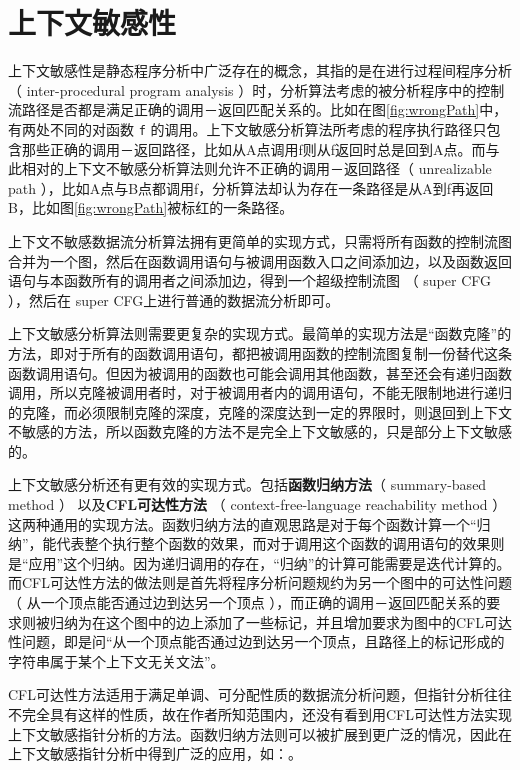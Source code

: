 \section{上下文敏感性}
上下文敏感性是静态程序分析中广泛存在的概念，其指的是在进行过程间程序分析（ inter-procedural program analysis ）时，分析算法考虑的被分析程序中的控制流路径是否都是满足正确的调用－返回匹配关系的。比如在图\ref{fig:wrongPath}中，有两处不同的对函数 \verb|f| 的调用。上下文敏感分析算法所考虑的程序执行路径只包含那些正确的调用－返回路径，比如从A点调用f则从f返回时总是回到A点。而与此相对的上下文不敏感分析算法则允许不正确的调用－返回路径（ unrealizable path ），比如A点与B点都调用f，分析算法却认为存在一条路径是从A到f再返回B，比如图\ref{fig:wrongPath}被标红的一条路径。

上下文不敏感数据流分析算法拥有更简单的实现方式，只需将所有函数的控制流图合并为一个图，然后在函数调用语句与被调用函数入口之间添加边，以及函数返回语句与本函数所有的调用者之间添加边，得到一个超级控制流图 （ super CFG ），然后在 super CFG上进行普通的数据流分析即可。

上下文敏感分析算法则需要更复杂的实现方式。最简单的实现方法是“函数克隆”的方法，即对于所有的函数调用语句，都把被调用函数的控制流图复制一份替代这条函数调用语句。但因为被调用的函数也可能会调用其他函数，甚至还会有递归函数调用，所以克隆被调用者时，对于被调用者内的调用语句，不能无限制地进行递归的克隆，而必须限制克隆的深度，克隆的深度达到一定的界限时，则退回到上下文不敏感的方法，所以函数克隆的方法不是完全上下文敏感的，只是部分上下文敏感的。

上下文敏感分析还有更有效的实现方式。包括\textbf{函数归纳方法}（ summary-based method ）\supercite{summary} 以及\textbf{CFL可达性方法} （ context-free-language reachability method ） \supercite{Reps1998}这两种通用的实现方法。函数归纳方法的直观思路是对于每个函数计算一个“归纳”，能代表整个执行整个函数的效果，而对于调用这个函数的调用语句的效果则是“应用”这个归纳。因为递归调用的存在，“归纳”的计算可能需要是迭代计算的。而CFL可达性方法的做法则是首先将程序分析问题规约为另一个图中的可达性问题（ 从一个顶点能否通过边到达另一个顶点 ），而正确的调用－返回匹配关系的要求则被归纳为在这个图中的边上添加了一些标记，并且增加要求为图中的CFL可达性问题，即是问“从一个顶点能否通过边到达另一个顶点，且路径上的标记形成的字符串属于某个上下文无关文法”。

CFL可达性方法适用于满足单调、可分配性质的数据流分析问题，但指针分析往往不完全具有这样的性质，故在作者所知范围内，还没有看到用CFL可达性方法实现上下文敏感指针分析的方法。函数归纳方法则可以被扩展到更广泛的情况，因此在上下文敏感指针分析中得到广泛的应用，如：\cite{cs-clone...}。

